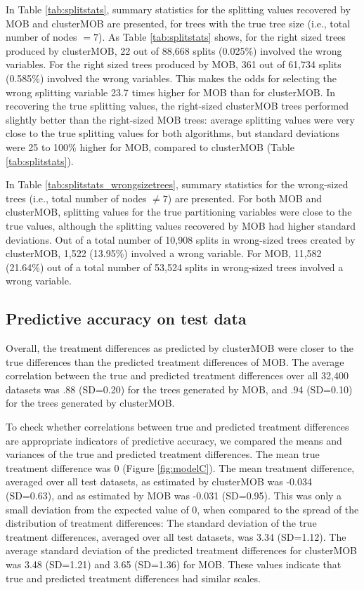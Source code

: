 \documentclass[nobf,man]{apa}
\begin{document}
In Table \ref{tab:splitstats}, summary statistics for the splitting values recovered by MOB and clusterMOB are presented, for trees with the true tree size (i.e., total number of nodes $= 7$). As Table \ref{tab:splitstats} shows, for the right sized trees produced by clusterMOB, 22 out of 88,668 splits (0.025\%) involved the wrong variables. For the right sized trees produced by MOB, 361 out of 61,734 splits (0.585\%) involved the wrong variables. This makes the odds for selecting the wrong splitting variable 23.7 times higher for MOB than for clusterMOB. In recovering the true splitting values, the right-sized clusterMOB trees performed slightly better than the right-sized MOB trees: average splitting values were very close to the true splitting values for both algorithms, but standard deviations were 25 to 100\% higher for MOB, compared to clusterMOB (Table \ref{tab:splitstats}).



In Table \ref{tab:splitstats_wrongsizetrees}, summary statistics for the wrong-sized trees (i.e., total number of nodes $\neq 7$) are presented. For both MOB and clusterMOB, splitting values for the true partitioning variables were close to the true values, although the splitting values recovered by MOB had higher standard deviations. Out of a total number of 10,908 splits in wrong-sized trees created by clusterMOB, 1,522 (13.95\%) involved a wrong variable. For MOB, 11,582 (21.64\%) out of a total number of 53,524 splits in wrong-sized trees involved a wrong variable.









\subsection{Predictive accuracy on test data}

Overall, the treatment differences as predicted by clusterMOB were closer to the true differences than the predicted treatment differences of MOB. The average correlation between the true and predicted treatment differences over all 32,400 datasets was .88 (SD=0.20) for the trees generated by MOB, and .94 (SD=0.10) for the trees generated by clusterMOB.

To check whether correlations between true and predicted treatment differences are appropriate indicators of predictive accuracy, we compared the means and variances of the true and predicted treatment differences. The mean true treatment difference was 0 (Figure \ref{fig:modelC}). The mean treatment difference, averaged over all test datasets, as estimated by clusterMOB was -0.034 (SD=0.63), and as estimated by MOB was -0.031 (SD=0.95). This was only a small deviation from the expected value of 0, when compared to the spread of the distribution of treatment differences: The standard deviation of the true treatment differences, averaged over all test datasets, was 3.34 (SD=1.12). The average standard deviation of the predicted treatment differences for clusterMOB was 3.48 (SD=1.21) and 3.65 (SD=1.36) for MOB. These values indicate that true and predicted treatment differences had similar scales.
\end{document}

